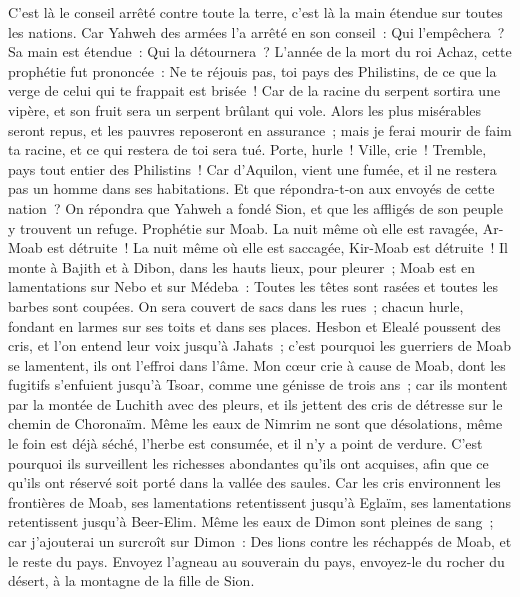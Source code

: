 \begin{multicols}{2}
C'est là le conseil arrêté contre toute la terre, c'est là la main étendue sur toutes les nations.
Car Yahweh des armées l'a arrêté en son conseil~: Qui l'empêchera~? Sa main est étendue~: Qui la détournera~?
L'année de la mort du roi Achaz, cette prophétie fut prononcée~: 
Ne te réjouis pas, toi pays des Philistins, de ce que la verge de celui qui te frappait est brisée~! Car de la racine du serpent sortira une vipère, et son fruit sera un serpent brûlant qui vole.
Alors les plus misérables seront repus, et les pauvres reposeront en assurance~; mais je ferai mourir de faim ta racine, et ce qui restera de toi sera tué.
Porte, hurle~! Ville, crie~! Tremble, pays tout entier des Philistins~! Car d'Aquilon, vient une fumée, et il ne restera pas un homme dans ses habitations.
Et que répondra-t-on aux envoyés de cette nation~? On répondra que Yahweh a fondé Sion, et que les affligés de son peuple y trouvent un refuge.
\VerseOne{}Prophétie sur Moab. La nuit même où elle est ravagée, Ar-Moab est détruite~! La nuit même où elle est saccagée, Kir-Moab est détruite~!
Il monte à Bajith et à Dibon, dans les hauts lieux, pour pleurer~; Moab est en lamentations sur Nebo et sur Médeba~: Toutes les têtes sont rasées et toutes les barbes sont coupées.
On sera couvert de sacs dans les rues~; chacun hurle, fondant en larmes sur ses toits et dans ses places.
Hesbon et Elealé poussent des cris, et l'on entend leur voix jusqu'à Jahats~; c'est pourquoi les guerriers de Moab se lamentent, ils ont l'effroi dans l'âme.
Mon cœur crie à cause de Moab, dont les fugitifs s'enfuient jusqu'à Tsoar, comme une génisse de trois ans~; car ils montent par la montée de Luchith avec des pleurs, et ils jettent des cris de détresse sur le chemin de Choronaïm.
Même les eaux de Nimrim ne sont que désolations, même le foin est déjà séché, l'herbe est consumée, et il n'y a point de verdure.
C'est pourquoi ils surveillent les richesses abondantes qu'ils ont acquises, afin que ce qu'ils ont réservé soit porté dans la vallée des saules.
Car les cris environnent les frontières de Moab, ses lamentations retentissent jusqu'à Eglaïm, ses lamentations retentissent jusqu'à Beer-Elim.
Même les eaux de Dimon sont pleines de sang~; car j'ajouterai un surcroît sur Dimon~: Des lions contre les réchappés de Moab, et le reste du pays.
\VerseOne{}Envoyez l'agneau au souverain du pays, envoyez-le du rocher du désert, à la montagne de la fille de Sion.

\end{multicols}
